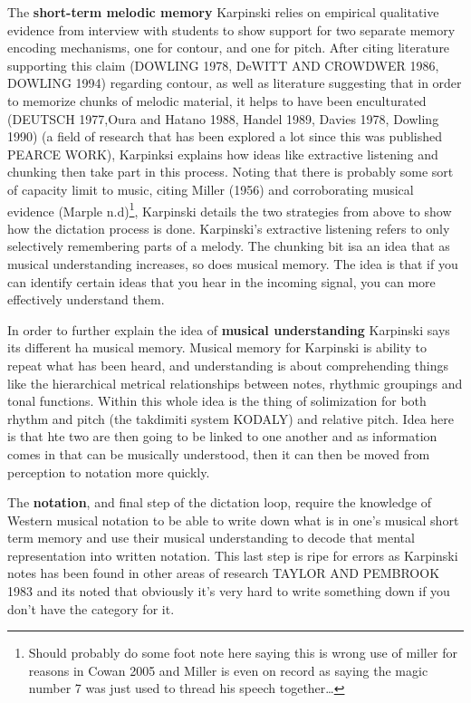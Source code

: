 \documentclass[]{book}
\let\rmarkdownfootnote\footnote%
\def\footnote{\protect\rmarkdownfootnote}
\theoremstyle{definition}
\theoremstyle{definition}
\theoremstyle{definition}
\theoremstyle{remark}
\begin{document}
The \textbf{short-term melodic memory} Karpinski relies on empirical
qualitative evidence from interview with students to show support for
two separate memory encoding mechanisms, one for contour, and one for
pitch. After citing literature supporting this claim (DOWLING 1978,
DeWITT AND CROWDWER 1986, DOWLING 1994) regarding contour, as well as
literature suggesting that in order to memorize chunks of melodic
material, it helps to have been enculturated (DEUTSCH 1977,Oura and
Hatano 1988, Handel 1989, Davies 1978, Dowling 1990) (a field of
research that has been explored a lot since this was published PEARCE
WORK), Karpinksi explains how ideas like extractive listening and
chunking then take part in this process. Noting that there is probably
some sort of capacity limit to music, citing Miller (1956) and
corroborating musical evidence (Marple n.d)\footnote{Should probably do
  some foot note here saying this is wrong use of miller for reasons in
  Cowan 2005 and Miller is even on record as saying the magic number 7
  was just used to thread his speech together\ldots{}}, Karpinski
details the two strategies from above to show how the dictation process
is done. Karpinski's extractive listening refers to only selectively
remembering parts of a melody. The chunking bit isa an idea that as
musical understanding increases, so does musical memory. The idea is
that if you can identify certain ideas that you hear in the incoming
signal, you can more effectively understand them.

In order to further explain the idea of \textbf{musical understanding}
Karpinski says its different ha musical memory. Musical memory for
Karpinski is ability to repeat what has been heard, and understanding is
about comprehending things like the hierarchical metrical relationships
between notes, rhythmic groupings and tonal functions. Within this whole
idea is the thing of solimization for both rhythm and pitch (the
takdimiti system KODALY) and relative pitch. Idea here is that hte two
are then going to be linked to one another and as information comes in
that can be musically understood, then it can then be moved from
perception to notation more quickly.

The \textbf{notation}, and final step of the dictation loop, require the
knowledge of Western musical notation to be able to write down what is
in one's musical short term memory and use their musical understanding
to decode that mental representation into written notation. This last
step is ripe for errors as Karpinski notes has been found in other areas
of research TAYLOR AND PEMBROOK 1983 and its noted that obviously it's
very hard to write something down if you don't have the category for it.
\end{document}
